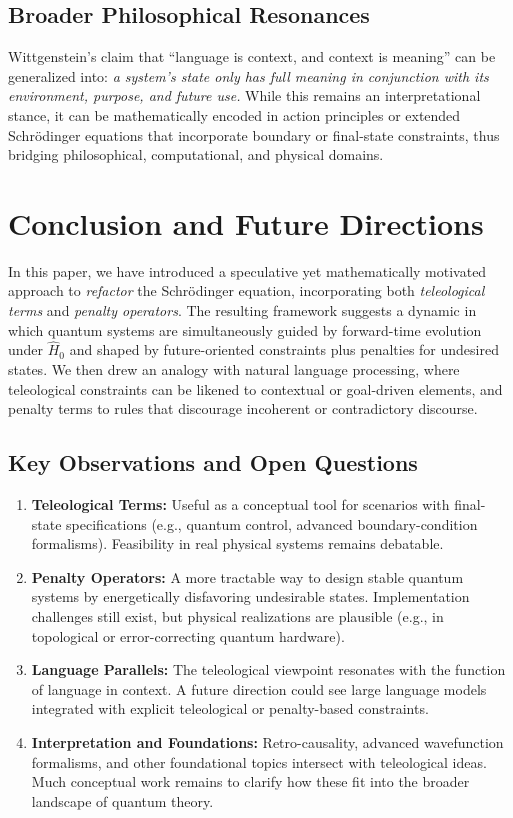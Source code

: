 \documentclass[11pt]{article}
\begin{document}
\subsection{Broader Philosophical Resonances}
Wittgenstein’s claim that ``language is context, and context is meaning'' can be generalized into: \emph{a system’s state only has full meaning in conjunction with its environment, purpose, and future use.} While this remains an interpretational stance, it can be mathematically encoded in action principles or extended Schr\"odinger equations that incorporate boundary or final-state constraints, thus bridging philosophical, computational, and physical domains.

\section{Conclusion and Future Directions}
\label{sec:conclusion}
In this paper, we have introduced a speculative yet mathematically motivated approach to \emph{refactor} the Schr\"odinger equation, incorporating both \emph{teleological terms} and \emph{penalty operators}. The resulting framework suggests a dynamic in which quantum systems are simultaneously guided by forward-time evolution under $\hat{H}_0$ and shaped by future-oriented constraints plus penalties for undesired states. We then drew an analogy with natural language processing, where teleological constraints can be likened to contextual or goal-driven elements, and penalty terms to rules that discourage incoherent or contradictory discourse.

\subsection{Key Observations and Open Questions}
\begin{enumerate}
    \item \textbf{Teleological Terms:} Useful as a conceptual tool for scenarios with final-state specifications (e.g., quantum control, advanced boundary-condition formalisms). Feasibility in real physical systems remains debatable.
    \item \textbf{Penalty Operators:} A more tractable way to design stable quantum systems by energetically disfavoring undesirable states. Implementation challenges still exist, but physical realizations are plausible (e.g., in topological or error-correcting quantum hardware).
    \item \textbf{Language Parallels:} The teleological viewpoint resonates with the function of language in context. A future direction could see large language models integrated with explicit teleological or penalty-based constraints.
    \item \textbf{Interpretation and Foundations:} Retro-causality, advanced wavefunction formalisms, and other foundational topics intersect with teleological ideas. Much conceptual work remains to clarify how these fit into the broader landscape of quantum theory.
\end{enumerate}
\end{document}
